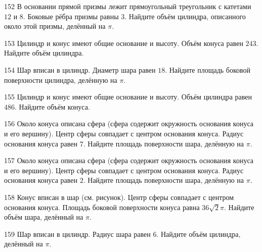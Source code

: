 \documentclass[4apaper]{article}
\begin{document}
\begin{taskBN}{152}
В основании прямой призмы лежит прямоугольный треугольник с катетами $12$ и $8$. Боковые рёбра призмы равны $3$. Найдите объём цилиндра, описанного около этой призмы, делённый на $\pi$.
\end{taskBN}

\begin{taskBN}{153}
Цилиндр и конус имеют общие основание и высоту. Объём конуса равен $243$. Найдите объём цилиндра.
\end{taskBN}

\begin{taskBN}{154}
Шар вписан в цилиндр. Диаметр шара равен $18$. Найдите площадь боковой поверхности цилиндра, делённую на $\pi$.
\end{taskBN}

\begin{taskBN}{155}
Цилиндр и конус имеют общие основание и высоту. Объём цилиндра равен $486$. Найдите объём конуса.
\end{taskBN}

\begin{taskBN}{156}
Около конуса описана сфера (сфера содержит окружность основания конуса и его вершину). Центр сферы совпадает с центром основания конуса. Радиус основания конуса равен $7$. Найдите площадь поверхности шара, делённую на $\pi$.
\end{taskBN}

\begin{taskBN}{157}
Около конуса описана сфера (сфера содержит окружность основания конуса и его вершину). Центр сферы совпадает с центром основания конуса. Радиус основания конуса равен $2$. Найдите площадь поверхности шара, делённую на $\pi$.
\end{taskBN}

\begin{taskBN}{158}
Конус вписан в шар (см. рисунок). Центр сферы совпадает с центром основания конуса. Площадь боковой поверхности конуса равна $36\sqrt{2}\pi$. Найдите объём шара, делённый на $\pi$.
\end{taskBN}

\begin{taskBN}{159}
Шар вписан в цилиндр. Радиус шара равен $6$. Найдите объём цилиндра, делённый на $\pi$.
\end{taskBN}
\end{document}
